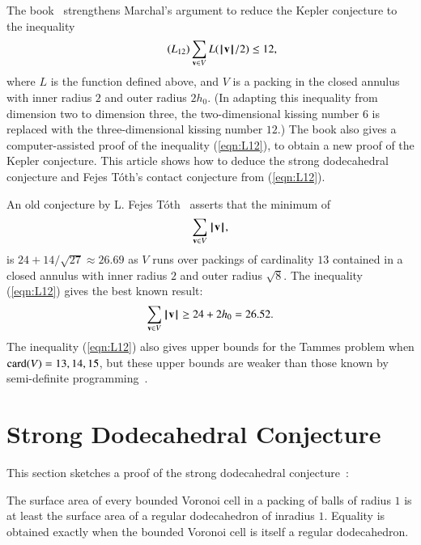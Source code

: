 \documentclass{llncs}
\begin{document}
\begin{remark}
The book~\cite{DSP} strengthens Marchal's argument to reduce
the Kepler conjecture to the inequality
\begin{equation}\label{eqn:L12}\tag{$L_{12}$}
\sum_{\v \in V} L(\normo{\v}/2) \le 12,
\end{equation}
where $L$ is the function defined above, and $V$ is a packing in the
closed annulus with inner radius $2$ and outer radius $2h_0$.  (In
adapting this inequality from dimension two to dimension three, the
two-dimensional kissing number $6$ is replaced with the
three-dimensional kissing number $12$.) The book also gives a
computer-assisted proof of the inequality (\ref{eqn:L12}), to obtain a
new proof of the Kepler conjecture.  This article shows how to deduce
the strong dodecahedral conjecture and Fejes T\'oth's contact
conjecture from (\ref{eqn:L12}).
\end{remark}

\begin{remark}
An old conjecture by L. Fejes
T\'oth~\cite[p.~178]{Toth:1972:Lagerungen} asserts that the minimum of
\begin{equation}\label{eqn:FT}
\sum_{{\mathbf v}\in V} {{\hskip0.1em|\hskip-0.15em|\hskip0.1em}{\mathbf v}{\hskip0.1em|\hskip-0.15em|\hskip0.1em}},
\end{equation}
is $24+ 14/\sqrt{27}\approx 26.69$
as $V$ runs over packings of cardinality $13$ contained in a closed
annulus with inner radius $2$ and outer radius $\sqrt8$.  The
inequality (\ref{eqn:L12}) gives the best known result:
\begin{equation}
\sum_{{\mathbf v}\in V} {{\hskip0.1em|\hskip-0.15em|\hskip0.1em}{\mathbf v}{\hskip0.1em|\hskip-0.15em|\hskip0.1em}}\ge 24 + 2 h_0 = 26.52.
\end{equation}
The inequality (\ref{eqn:L12}) also gives upper bounds for the Tammes
problem when ${\operatorname{card}}(V)=13,14,15$, but these upper bounds are weaker
than those known by semi-definite programming~\cite{BV08}.
\end{remark}

\section{Strong Dodecahedral Conjecture}

This section sketches a proof of the strong dodecahedral
conjecture~\cite{Bezdek00}:

\begin{theorem}
  The surface area of every bounded Voronoi cell in a packing of balls
  of radius $1$ is at least the surface area of a regular dodecahedron
  of inradius $1$.  Equality is obtained exactly when the bounded
  Voronoi cell is itself a regular dodecahedron.
\end{theorem}
\end{document}
